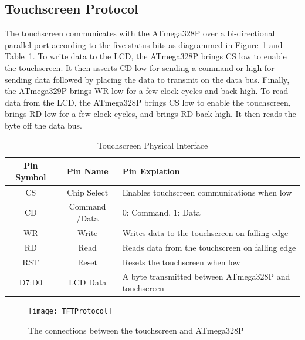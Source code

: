 		\subsection{Touchscreen Protocol}
			The touchscreen communicates with the ATmega328P over a bi-directional parallel port according to the five status bits as diagrammed in Figure~\ref{fig:TFTProtocol} and Table~\ref{tab:TouchscreenProtocol}. To write data to the LCD, the ATmega328P brings CS low to enable the touchscreen. It then asserts CD low for sending a command or high for sending data followed by placing the data to transmit on the data bus. Finally, the ATmega329P brings WR low for a few clock cycles and back high. To read data from the LCD, the ATmega328P brings CS low to enable the touchscreen, brings RD low for a few clock cycles, and brings RD back high. It then reads the byte off the data bus.
			\begin{table}[h!]
				\centering
				\caption{Touchscreen Physical Interface}
				\label{tab:TouchscreenProtocol}
				\begin{tabular}{c c l}
					\toprule[1.2pt]
					Pin Symbol & Pin Name & Pin Explation\\ \hline
					$\overline{\textrm{CS}}$ & $\overline{\textrm{Chip Select}}$ & Enables touchscreen communications when low\\
					CD & $\overline{\textrm{Command}}$/Data & 0: Command, 1: Data\\
					WR & Write & Writes data to the touchscreen on falling edge\\
					RD & Read & Reads data from the touchscreen on falling edge\\
					$\overline{\textrm{RST}}$ & $\overline{\textrm{Reset}}$ & Resets the touchscreen when low\\
					D7:D0 & LCD Data & A byte transmitted between ATmega328P and touchscreen\\ \bottomrule[1.2pt]
				\end{tabular}
			\end{table}
			
			\begin{figure}[h!]
				\centering
				\texttt{[image: TFTProtocol]}
				\caption{The connections between the touchscreen and ATmega328P}
				\label{fig:TFTProtocol}
			\end{figure}
			
	
